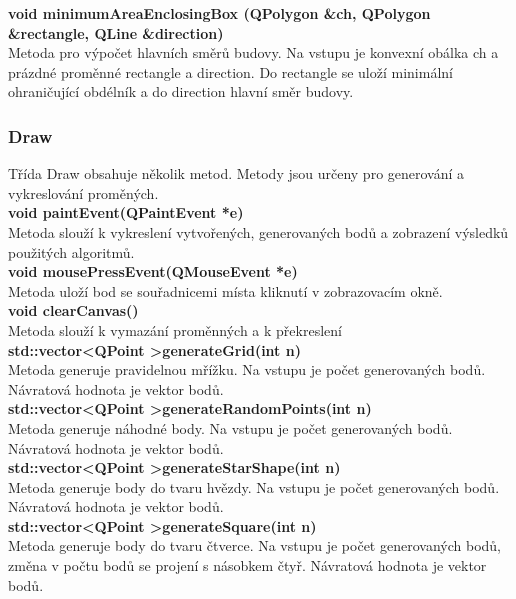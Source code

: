\documentclass[a4paper, 12pt]{article}
\begin{document}
\textbf{void minimumAreaEnclosingBox (QPolygon \&ch, QPolygon \&rectangle, QLine \&direction)}\\
Metoda pro výpočet hlavních směrů budovy. Na vstupu je konvexní obálka ch a prázdné proměnné rectangle a direction. Do rectangle se uloží minimální ohraničující obdélník a do direction hlavní směr budovy.
\\

\subsubsection{Draw}
Třída Draw obsahuje několik metod. Metody jsou určeny pro generování a vykreslování proměných.
\\

\textbf{void paintEvent(QPaintEvent *e)}\\
Metoda slouží k vykreslení vytvořených, generovaných bodů a zobrazení výsledků použitých algoritmů.
\\

\textbf{void mousePressEvent(QMouseEvent *e)}\\
Metoda uloží bod se souřadnicemi místa kliknutí v zobrazovacím okně.
\\

\textbf{void clearCanvas()}\\
Metoda slouží k vymazání proměnných a k překreslení
\\

\textbf{std::vector\textless QPoint \textgreater generateGrid(int n)}\\
Metoda generuje pravidelnou mřížku. Na vstupu je počet generovaných bodů. Návratová hodnota je vektor bodů.\\

\textbf{std::vector\textless QPoint \textgreater generateRandomPoints(int n)}\\
Metoda generuje náhodné body. Na vstupu je počet generovaných bodů. Návratová hodnota je vektor bodů.\\

\textbf{std::vector\textless QPoint \textgreater generateStarShape(int n)}\\
Metoda generuje body do tvaru hvězdy. Na vstupu je počet generovaných bodů. Návratová hodnota je vektor bodů.\\

\textbf{std::vector\textless QPoint \textgreater generateSquare(int n)}\\
Metoda generuje body do tvaru čtverce. Na vstupu je počet generovaných bodů, změna v počtu bodů se projení s násobkem čtyř. Návratová hodnota je vektor bodů.\\
\end{document}
